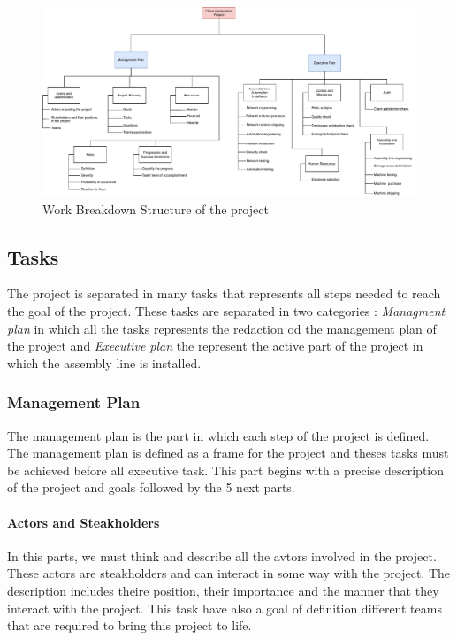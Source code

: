 \begin{figure}[h]

\centering
\includegraphics[scale=0.5]{Img/wbs-management-inter.pdf}
\caption{Work Breakdown Structure of the project}

\end{figure}

\subsection{Tasks}

The project is separated in many tasks that represents all steps needed to reach the goal of the project.
These tasks are separated in two categories : \emph{Managment plan} in which all the tasks represents the redaction od the management plan of the project and \emph{Executive plan} the represent the active part of the project in which the assembly line is installed.

\subsubsection{Management Plan}

The management plan is the part in which each step of the project is defined.
The management plan is defined as a frame for the project and theses tasks must be achieved before all executive task.
This part begins with a precise description of the project and goals followed by the 5 next parts.

\paragraph{Actors and Steakholders} In this parts, we must think and describe all the avtors involved in the project.
These actors are steakholders and can interact in some way with the project.
The description includes theire position, their importance and the manner that they interact with the project.
This task have also a goal of definition different teams that are required to bring this project to life.

